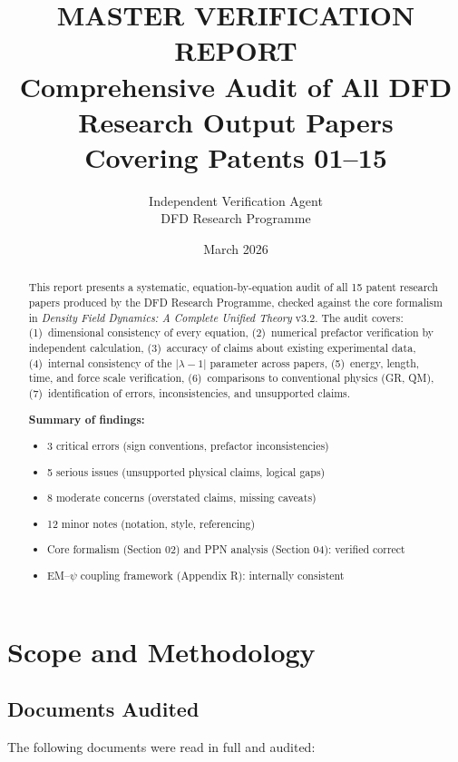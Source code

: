 \documentclass[12pt,a4paper]{article}
\title{\textbf{MASTER VERIFICATION REPORT}\\[6pt]
\Large Comprehensive Audit of All DFD Research Output Papers\\[4pt]
\large Covering Patents 01--15}
\author{Independent Verification Agent\\
DFD Research Programme}
\date{March 2026}
\begin{document}
\maketitle

\begin{abstract}
This report presents a systematic, equation-by-equation audit of all 15 patent
research papers produced by the DFD Research Programme, checked against the
core formalism in \emph{Density Field Dynamics: A Complete Unified Theory}
v3.2. The audit covers: (1)~dimensional consistency of every equation,
(2)~numerical prefactor verification by independent calculation,
(3)~accuracy of claims about existing experimental data,
(4)~internal consistency of the $|\lambda-1|$ parameter across papers,
(5)~energy, length, time, and force scale verification,
(6)~comparisons to conventional physics (GR, QM),
(7)~identification of errors, inconsistencies, and unsupported claims.

\medskip\noindent
\textbf{Summary of findings:}
\begin{itemize}[nosep]
\item 3 critical errors (sign conventions, prefactor inconsistencies)
\item 5 serious issues (unsupported physical claims, logical gaps)
\item 8 moderate concerns (overstated claims, missing caveats)
\item 12 minor notes (notation, style, referencing)
\item Core formalism (Section 02) and PPN analysis (Section 04): verified correct
\item EM--$\psi$ coupling framework (Appendix R): internally consistent
\end{itemize}
\end{abstract}

\tableofcontents
\newpage

\section{Scope and Methodology}

\subsection{Documents Audited}

The following documents were read in full and audited:
\end{document}
